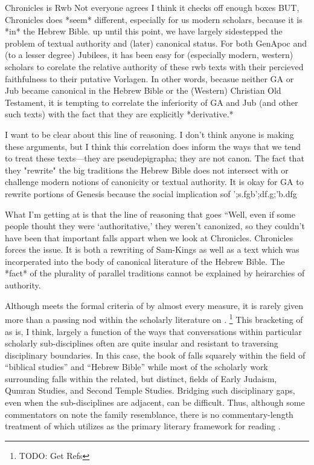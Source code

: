 

Chronicles is Rwb
    Not everyone agrees
    I think it checks off enough boxes
BUT, Chronicles does *seem* different, especially for us modern scholars, because it is *in* the Hebrew Bible. up until this point, we have largely sidestepped the problem of textual authority and (later) canonical status. For both GenApoc and (to a lesser degree) Jubilees, it has been easy for (especially modern, western) scholars to corelate the relative authority of these rwb texts with their percieved faithfulness to their putative Vorlagen. In other words, becasue neither GA or Jub became canonical in the Hebrew Bible or the (Western) Christian Old Testament, it is tempting to correlate the inferiority of GA and Jub (and other such texts) with the fact that they are explicitly *derivative.* 

I want to be clear about this line of reasoning. I don't think anyone is making these arguments, but I think this correlation does inform the ways that we tend to treat these texts---they are pseudepigrapha; they are not canon. The fact that they "rewrite" the big traditions the Hebrew Bible does not intersect with or challenge modern notions of canonicity or textual authority. It is okay for GA to rewrite portions of Genesis because the social implication sof ';s.fgb';df.g;'b.dfg

What I'm getting at is that the line of reasoning that goes ``Well, even if some people thouht they were `authoritative,' they weren't canonized, so they couldn't have been that important falls appart when we look at Chronicles. Chronicles forces the issue. It is both a rewriting of Sam-Kings as well as a text which was incorperated into the body of canonical literature of the Hebrew Bible. The *fact* of the plurality of parallel traditions cannot be explained by heirarchies of authority.






Although \chronicles meets the formal criteria of \rwb by almost every measure, it is rarely given more than a passing nod within the scholarly literature on \rwb.%
    \footnote{TODO: Get Refs}
This bracketing of \chronicles as \rwb is, I think, largely a function of the ways that conversations within particular scholarly sub-disciplines often are quite insular and resistant to traversing disciplinary boundaries. In this case, the book of \chronicles falls squarely within the field of ``biblical studies'' and ``Hebrew Bible'' while most of the scholarly work surrounding \rwb falls within the related, but distinct, fields of Early Judaism, Qumran Studies, and Second Temple Studies. Bridging such disciplinary gaps, even when the sub-disciplines are adjacent, can be difficult. Thus, although some commentators on \chronicles note the family resemblance, there is no commentary-length treatment of \chronicles which utilizes \rwb as the primary literary framework for reading \chronicles.

